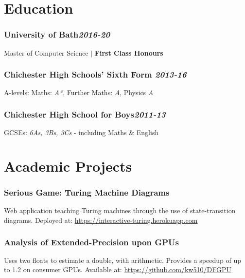\documentclass[11pt,a4paper]{report}
\begin{document}
\begin{minipage}{0.475\textwidth}
	\section*{\normalfont Education}
		\vfill\subsubsection*{University of Bath\hfill \normalfont\textit{2016-20}}\vspace{-0.25cm}
		Master of Computer Science $\vert$ \textbf{First Class Honours}

		\vfill\subsubsection*{Chichester High Schools' Sixth Form \hfill \normalfont\textit{2013-16}}\vspace{-0.25cm}
		A-levels: Maths: \textit{A*},  Further Maths: \textit{A}, Physics \textit{A}
		
		\vfill\subsubsection*{Chichester High School for Boys\hfill \normalfont\textit{2011-13}}\vspace{-0.25cm}
		GCSEs: \textit{6As, 3Bs, 3Cs} - including Maths \& English

	\section*{\normalfont Academic Projects}
		\vfill\subsubsection*{Serious Game: Turing Machine Diagrams}
			Web application teaching Turing machines through the use of state-transition diagrams.
			Deployed at: \url{https://interactive-turing.herokuapp.com}
		
		\vfill\subsubsection*{Analysis of Extended-Precision upon GPUs}
			Uses two floats to estimate a double, with arithmetic. Provides a speedup of up to 1.2 on consumer GPUs. 
			Available at: \url{https://github.com/kw510/DFGPU}

\end{minipage}
\end{document}
